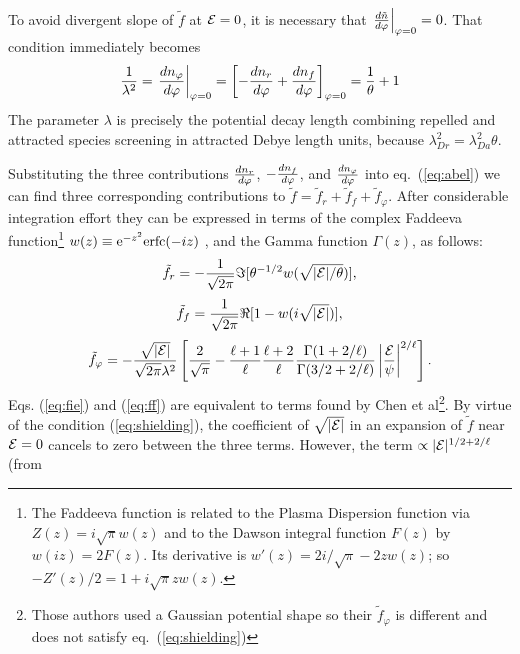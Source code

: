 \documentclass[aip,pop,article-title]{revtex4-2}
\def\energy{{\cal E}}
\def\etothe#1{{\rm e}^{#1}}
\begin{document}
To avoid divergent slope of $\tilde f$ at $\energy=0$, it is necessary
that $\left.d\tilde n\over d\varphi\right|_{\varphi=0}=0$. That condition 
immediately becomes
\begin{equation}
  \label{eq:shielding}
  {1\over\lambda^2}=\left.{dn_\varphi\over d\varphi}\right|_{\varphi=0}=
\left[-{dn_r\over d\varphi }+{dn_f\over d\varphi
  }\right]_{\varphi=0}={1\over\theta}+1
\end{equation}
The parameter $\lambda$ is precisely the
potential decay length combining repelled and attracted species
screening in attracted Debye length units, because
$\lambda_{Dr}^2=\lambda_{Da}^2\theta$.

Substituting the three contributions $dn_r\over d\varphi $,
$-{dn_f\over d\varphi }$, and ${dn_\varphi\over d\varphi }$ into eq.\
(\ref{eq:abel}) we can find three corresponding contributions to
$\tilde f=\tilde f_{r}+\tilde f_f+\tilde f_\varphi$. After considerable
integration effort they can be expressed in terms of the complex
Faddeeva function\footnote{The Faddeeva function is related to the
  Plasma Dispersion function via $Z(z)=i\sqrt{\pi} w(z)$ and to the
  Dawson integral function $F(z)$ by $w(iz)=2F(z)$. Its derivative is
  $w'(z)=2i/\sqrt{\pi}-2zw(z)$; so $-Z'(z)/2=1+i\sqrt{\pi}zw(z)$.}
$w(z)\equiv\etothe{-z^2}{\rm erfc}(-iz)$ , and the Gamma function
$\Gamma(z)$, as follows:
\begin{equation}
  \label{eq:fie}
  \tilde f_{r}=-{1\over \sqrt{2\pi}}\Im[\theta^{-1/2}w(\sqrt{|\energy|/\theta})],
\end{equation}
\begin{equation}
  \label{eq:ff}
  \tilde f_{f}={1\over \sqrt{2\pi}}\Re[1-w(i\sqrt{|\energy|})],
\end{equation}
\begin{equation}
  \label{eq:fphi}
  \tilde f_\varphi=-{\sqrt{|\energy|}\over \sqrt{2\pi}\lambda^2}
  \left[{2\over \sqrt{\pi}} -
    {\ell+1\over \ell}{\ell+2\over \ell}
    {\Gamma(1+2/\ell)\over \Gamma(3/2+2/\ell)}
    \left|\energy\over \psi\right|^{2/\ell}
    \right].
\end{equation}
Eqs. (\ref{eq:fie}) and (\ref{eq:ff}) are equivalent to terms found by
Chen et al\cite{Chen2004}\footnote{Those authors used a Gaussian potential shape so
  their $\tilde f_\varphi$ is different and does not satisfy eq.\
  (\ref{eq:shielding})}. By virtue of the condition
(\ref{eq:shielding}), the coefficient of $\sqrt{|\energy|}$ in an
expansion of $\tilde f$ near $\energy=0$ cancels to zero between the
three terms. However, the term $\propto |\energy|^{1/2+2/\ell}$ (from
\end{document}
